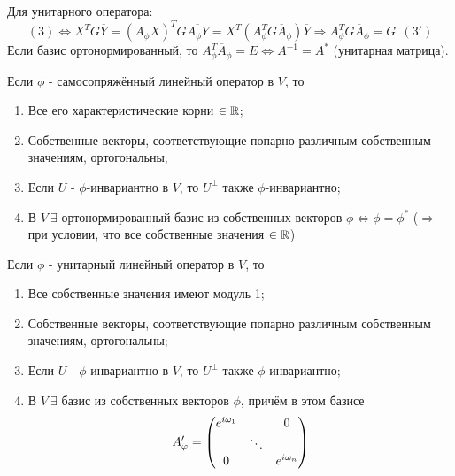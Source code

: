 Для унитарного оператора:
$$(3) \Longleftrightarrow X^TG\overline{Y} = (A_\phi X)^TG\overline{A_\phi Y} = X^T(A_\phi^TG\overline{A}_\phi)\overline{Y} \Longrightarrow A_\phi^TG\overline{A}_\phi = G  \ \ (3')$$
Если базис ортонормированный, то $A_\phi^T\overline{A}_\phi = E \Longleftrightarrow A^{-1} = A^*$ (унитарная матрица).

\begin{theorem}
    Если $\phi$ - самосопряжённый линейный оператор в $V$, то
    \begin{enumerate}
        \item Все его характеристические корни $\in \mathbb{R}$;
        \item Собственные векторы, соответствующие попарно различным собственным значениям, ортогональны;
        \item Если $U$ - $\phi$-инвариантно в $V$, то $U^\perp$ также $\phi$-инвариантно;
        \item В $V \ \exists$ ортонормированный базис из собственных векторов $\phi \Longleftrightarrow \phi = \phi^*$ ($\Longrightarrow$ при условии, что все собственные значения $\in \mathbb{R}$)
    \end{enumerate}
\end{theorem}
\begin{theorem}
    Если $\phi$ - унитарный линейный оператор в $V$, то 
    \begin{enumerate}
        \item Все собственные значения имеют модуль 1;
        \item Собственные векторы, соответствующие попарно различным собственным значениям, ортогональны;
        \item Если $U$ - $\phi$-инвариантно в $V$, то $U^\perp$ также $\phi$-инвариантно;
        \item В $V \ \exists$ базис из собственных векторов $\phi$, причём в этом базисе
        $$A'_\phi = \begin{pmatrix}e^{i\omega_1}&\null&0\\\null&\ddots&\null\\0&\null&e^{i\omega_n}\end{pmatrix}$$
    \end{enumerate}
\end{theorem}
